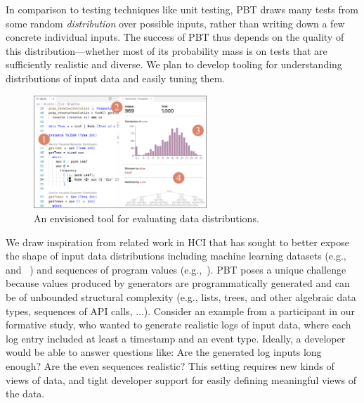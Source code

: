 %
In comparison to testing techniques like unit testing, PBT draws many
tests from some
random {\em distribution} over possible inputs, rather than writing down a few
concrete individual inputs. The success  of
PBT thus depends on the quality of this distribution---whether
most of its probability mass is on tests that are sufficiently
realistic and diverse. We plan
to develop tooling for
understanding distributions of input data and easily tuning them.

\begin{figure}
  \centering
  \includegraphics[width=0.58\textwidth]{assets/gen-vis.pdf}
  \caption{An envisioned tool for evaluating data distributions.
    }\label{fig:gen-vis}
\end{figure}

We draw inspiration from related work in HCI that has sought to better expose
the shape of input data distributions including
machine learning datasets
(e.g.,~\cite{ref:hohman2019gamut} and
~\cite{ref:hohman2020understanding}) and sequences of program values
(e.g.,~\cite{ref:kang2017omnicode}).
PBT poses a unique challenge because values produced by generators are
programmatically generated and
can be of unbounded structural
complexity (e.g., lists, trees, and other algebraic data types,
sequences of API calls, ...).
Consider an
example from a participant in our formative study, who wanted to generate
realistic logs of input data, where each log entry included at least a timestamp
and an event type.
Ideally, a developer would be able to answer
questions like: Are the generated log inputs long enough? Are the even sequences
realistic? This setting requires new kinds of views of data, and tight
developer support for easily defining meaningful views of the data.

